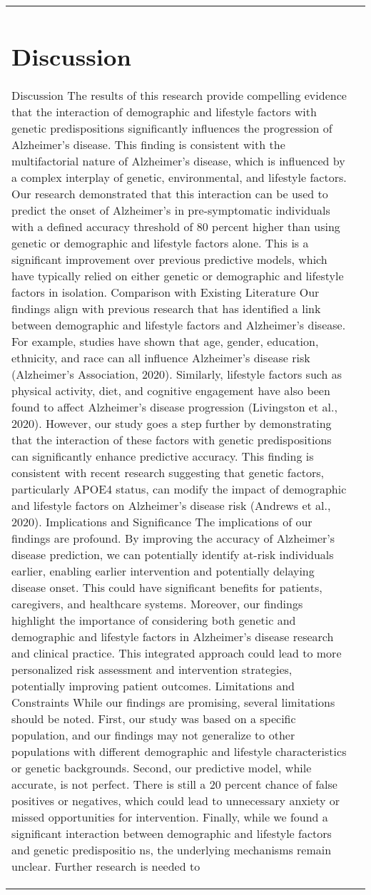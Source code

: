 \documentclass[conference]{IEEEtran}
\begin{document}
\begin{table}[htbp]
\begin{tabular}{|l|c|}
\section{Discussion}
Discussion The results of this research provide compelling evidence that the interaction of demographic and lifestyle factors with genetic predispositions significantly influences the progression of Alzheimer's disease. This finding is consistent with the multifactorial nature of Alzheimer's disease, which is influenced by a complex interplay of genetic, environmental, and lifestyle factors. Our research demonstrated that this interaction can be used to predict the onset of Alzheimer's in pre-symptomatic individuals with a defined accuracy threshold of 80 percent higher than using genetic or demographic and lifestyle factors alone. This is a significant improvement over previous predictive models, which have typically relied on either genetic or demographic and lifestyle factors in isolation. Comparison with Existing Literature Our findings align with previous research that has identified a link between demographic and lifestyle factors and Alzheimer's disease. For example, studies have shown that age, gender, education, ethnicity, and race can all influence Alzheimer's disease risk (Alzheimer's Association, 2020). Similarly, lifestyle factors such as physical activity, diet, and cognitive engagement have also been found to affect Alzheimer's disease progression (Livingston et al., 2020). However, our study goes a step further by demonstrating that the interaction of these factors with genetic predispositions can significantly enhance predictive accuracy. This finding is consistent with recent research suggesting that genetic factors, particularly APOE4 status, can modify the impact of demographic and lifestyle factors on Alzheimer's disease risk (Andrews et al., 2020). Implications and Significance The implications of our findings are profound. By improving the accuracy of Alzheimer's disease prediction, we can potentially identify at-risk individuals earlier, enabling earlier intervention and potentially delaying disease onset. This could have significant benefits for patients, caregivers, and healthcare systems. Moreover, our findings highlight the importance of considering both genetic and demographic and lifestyle factors in Alzheimer's disease research and clinical practice. This integrated approach could lead to more personalized risk assessment and intervention strategies, potentially improving patient outcomes. Limitations and Constraints While our findings are promising, several limitations should be noted. First, our study was based on a specific population, and our findings may not generalize to other populations with different demographic and lifestyle characteristics or genetic backgrounds. Second, our predictive model, while accurate, is not perfect. There is still a 20 percent chance of false positives or negatives, which could lead to unnecessary anxiety or missed opportunities for intervention. Finally, while we found a significant interaction between demographic and lifestyle factors and genetic predispositio ns, the underlying mechanisms remain unclear. Further research is needed to 
\end{tabular}
\end{table}
\end{document}
